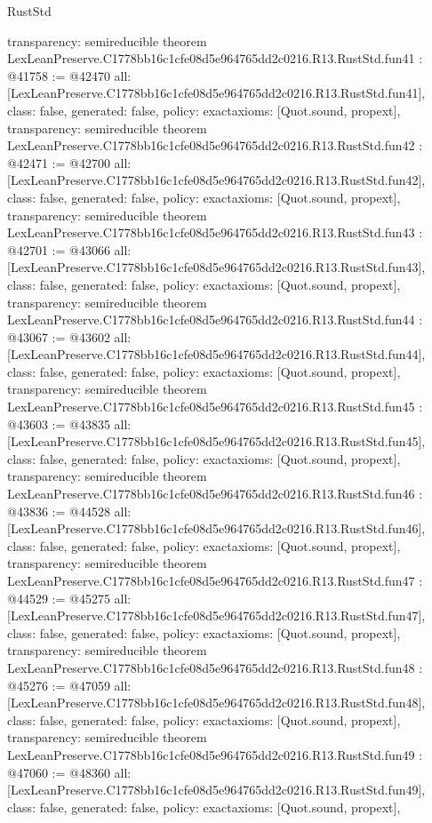 \begin{lexlean}{RustStd}
\begin{coremodule}
{  transparency: semireducible
}
theorem LexLeanPreserve.C1778bb16c1cfe08d5e964765dd2c0216.R13.RustStd.fun41 : @41758 := @42470 {
  all: [LexLeanPreserve.C1778bb16c1cfe08d5e964765dd2c0216.R13.RustStd.fun41],
  class: false,
  generated: false,
  policy: exact{axioms: [Quot.sound, propext]},
  transparency: semireducible
}
theorem LexLeanPreserve.C1778bb16c1cfe08d5e964765dd2c0216.R13.RustStd.fun42 : @42471 := @42700 {
  all: [LexLeanPreserve.C1778bb16c1cfe08d5e964765dd2c0216.R13.RustStd.fun42],
  class: false,
  generated: false,
  policy: exact{axioms: [Quot.sound, propext]},
  transparency: semireducible
}
theorem LexLeanPreserve.C1778bb16c1cfe08d5e964765dd2c0216.R13.RustStd.fun43 : @42701 := @43066 {
  all: [LexLeanPreserve.C1778bb16c1cfe08d5e964765dd2c0216.R13.RustStd.fun43],
  class: false,
  generated: false,
  policy: exact{axioms: [Quot.sound, propext]},
  transparency: semireducible
}
theorem LexLeanPreserve.C1778bb16c1cfe08d5e964765dd2c0216.R13.RustStd.fun44 : @43067 := @43602 {
  all: [LexLeanPreserve.C1778bb16c1cfe08d5e964765dd2c0216.R13.RustStd.fun44],
  class: false,
  generated: false,
  policy: exact{axioms: [Quot.sound, propext]},
  transparency: semireducible
}
theorem LexLeanPreserve.C1778bb16c1cfe08d5e964765dd2c0216.R13.RustStd.fun45 : @43603 := @43835 {
  all: [LexLeanPreserve.C1778bb16c1cfe08d5e964765dd2c0216.R13.RustStd.fun45],
  class: false,
  generated: false,
  policy: exact{axioms: [Quot.sound, propext]},
  transparency: semireducible
}
theorem LexLeanPreserve.C1778bb16c1cfe08d5e964765dd2c0216.R13.RustStd.fun46 : @43836 := @44528 {
  all: [LexLeanPreserve.C1778bb16c1cfe08d5e964765dd2c0216.R13.RustStd.fun46],
  class: false,
  generated: false,
  policy: exact{axioms: [Quot.sound, propext]},
  transparency: semireducible
}
theorem LexLeanPreserve.C1778bb16c1cfe08d5e964765dd2c0216.R13.RustStd.fun47 : @44529 := @45275 {
  all: [LexLeanPreserve.C1778bb16c1cfe08d5e964765dd2c0216.R13.RustStd.fun47],
  class: false,
  generated: false,
  policy: exact{axioms: [Quot.sound, propext]},
  transparency: semireducible
}
theorem LexLeanPreserve.C1778bb16c1cfe08d5e964765dd2c0216.R13.RustStd.fun48 : @45276 := @47059 {
  all: [LexLeanPreserve.C1778bb16c1cfe08d5e964765dd2c0216.R13.RustStd.fun48],
  class: false,
  generated: false,
  policy: exact{axioms: [Quot.sound, propext]},
  transparency: semireducible
}
theorem LexLeanPreserve.C1778bb16c1cfe08d5e964765dd2c0216.R13.RustStd.fun49 : @47060 := @48360 {
  all: [LexLeanPreserve.C1778bb16c1cfe08d5e964765dd2c0216.R13.RustStd.fun49],
  class: false,
  generated: false,
  policy: exact{axioms: [Quot.sound, propext]},
}
\end{coremodule}
\end{lexlean}
